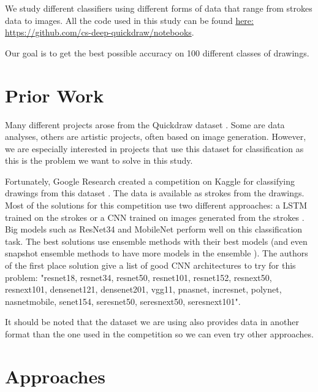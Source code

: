 \documentclass[10pt,twocolumn,letterpaper]{article}
\begin{document}
We study different classifiers using different forms of data that range from strokes data to images. All the code used in this study can be found \href{https://github.com/cs-deep-quickdraw/notebooks}{here: https://github.com/cs-deep-quickdraw/notebooks}.

Our goal is to get the best possible accuracy on 100 different classes of drawings.



\section{Prior Work}

Many different projects arose from the Quickdraw dataset \cite{GoogleQuickdraw}. Some are data analyses, others are artistic projects, often based on image generation. However, we are especially interested in projects that use this dataset for classification as this is the problem we want to solve in this study.

Fortunately, Google Research created a competition on Kaggle for classifying drawings from this dataset \cite{KaggleCompetition}. The data is available as strokes from the drawings. Most of the solutions for this competition use two different approaches: a LSTM trained on the strokes \cite{KaggleLSTM} or a CNN trained on images generated from the strokes \cite{KaggleCNN} \cite{KaggleMobileNet}. Big models such as ResNet34 \cite{KaggleResNet} and MobileNet \cite{KaggleMobileNet} perform well on this classification task. The best solutions use ensemble methods with their best models \cite{KaggleFirstPlace} (and even snapshot ensemble methods to have more models in the ensemble \cite{KaggleFifthPlace}). The authors of the first place solution give a list of good CNN architectures to try for this problem: "resnet18, resnet34, resnet50, resnet101, resnet152, resnext50, resnext101, densenet121, densenet201, vgg11, pnasnet, incresnet, polynet, nasnetmobile, senet154, seresnet50, seresnext50, seresnext101". \cite{KaggleFirstPlace}

It should be noted that the dataset we are using also provides data in another format than the one used in the competition so we can even try other approaches.

\section{Approaches}
\end{document}
